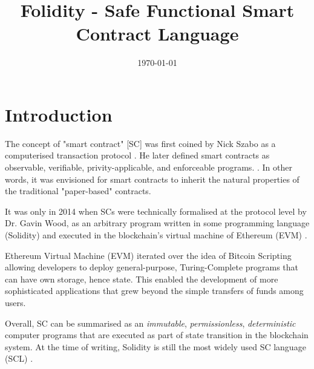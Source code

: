 \documentclass[oneside]{ecsproject}     %
\begin{document}
\frontmatter
\title      {Folidity - Safe Functional Smart Contract Language}
\addresses  {\groupname\\\deptname\\\univname}
\date       {\today}
\subject    {}
\keywords   {}
\maketitle
\tableofcontents
\mainmatter

\chapter{Introduction}

The concept of "smart contract" [SC] was first coined by Nick Szabo as a computerised transaction protocol \cite{nz_sc}.
He later defined smart contracts as observable, verifiable, privity-applicable, and enforceable programs. \cite{nz_sc_bb}.
In other words, it was envisioned for smart contracts to inherit the natural properties of the traditional
"paper-based" contracts.

It was only in 2014 when SCs were technically formalised at the protocol level by Dr. Gavin Wood, as an arbitrary program
written in some programming language (Solidity) and executed in the blockchain's virtual machine of Ethereum (EVM) \cite{eth_yellow_paper}.

Ethereum Virtual Machine (EVM) iterated over the idea of Bitcoin Scripting allowing developers to deploy general-purpose, Turing-Complete
programs that can have own storage, hence state. This enabled the development of more sophisticated applications that grew beyond
the simple transfers of funds among users.

Overall, SC can be summarised as an \textit{immutable}, \textit{permissionless}, \textit{deterministic} computer programs 
that are executed as part of state transition in the blockchain system. 
At the time of writing, Solidity is still the most widely used SC language (SCL) \cite{sc_survey}.
\end{document}
